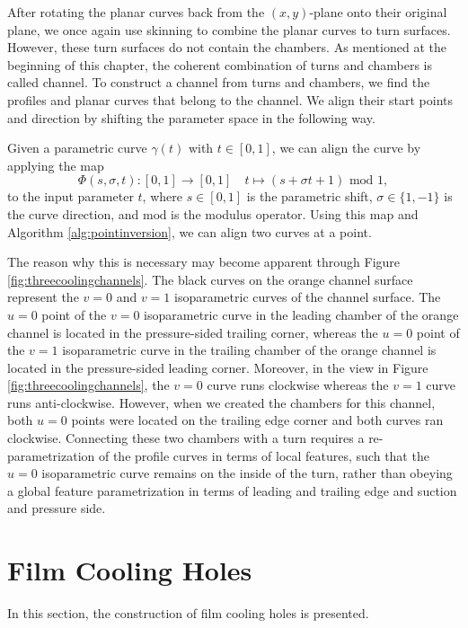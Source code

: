 \documentclass[a4paper, 11pt]{report}
\theoremstyle{definition}
\begin{document}
	After rotating the planar curves back from the $(x,y)$-plane onto their original plane, we once again use skinning to combine the planar curves to turn surfaces. However, these turn surfaces do not contain the chambers. As mentioned at the beginning of this chapter, the coherent combination of turns and chambers is called channel. To construct a channel from turns and chambers, we find the profiles and planar curves that belong to the channel. We align their start points and direction by shifting the parameter space in the following way.

	Given a parametric curve $\gamma(t)$ with $t \in [0,1]$, we can align the curve by applying the map
		$$ \Phi(s, \sigma, t): [0,1] \rightarrow [0,1] \quad t \mapsto (s+\sigma t+1) \textrm{ mod } 1, $$
	to the input parameter $t$, where $s \in [0,1]$ is the parametric shift, $\sigma \in \{1, -1\}$ is the curve direction, and $\textrm{mod}$ is the modulus operator. Using this map and Algorithm \ref{alg:pointinversion}, we can align two curves at a point.

	The reason why this is necessary may become apparent through Figure \ref{fig:threecoolingchannels}. The black curves on the orange channel surface represent the $v=0$ and $v=1$ isoparametric curves of the channel surface. The $u=0$ point of the $v=0$ isoparametric curve in the leading chamber of the orange channel is located in the pressure-sided trailing corner, whereas the $u=0$ point of the $v=1$ isoparametric curve in the trailing chamber of the orange channel is located in the pressure-sided leading corner. Moreover, in the view in Figure \ref{fig:threecoolingchannels}, the $v=0$ curve runs clockwise whereas the $v=1$ curve runs anti-clockwise. However, when we created the chambers for this channel, both $u=0$ points were located on the trailing edge corner and both curves ran clockwise. Connecting these two chambers with a turn requires a re-parametrization of the profile curves in terms of local features, such that the $u=0$ isoparametric curve remains on the inside of the turn, rather than obeying a global feature parametrization in terms of leading and trailing edge and suction and pressure side.

\section{Film Cooling Holes}\label{sec:filmcooling}
	In this section, the construction of film cooling holes is presented.
\end{document}
